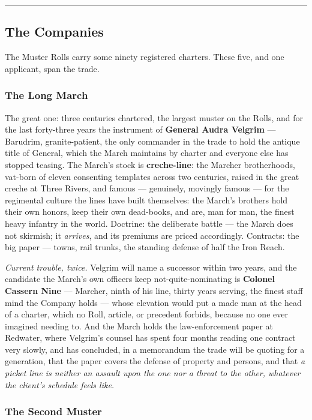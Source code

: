 \medskip\hrule\medskip

\subsection{The Companies}

The Muster Rolls carry some ninety registered charters. These five, and one applicant, span the trade.

\subsubsection{The Long March}

The great one: three centuries chartered, the largest muster on the Rolls, and for the last forty-three years the instrument of \textbf{General Audra Velgrim} --- Barudrim, granite-patient, the only commander in the trade to hold the antique title of General, which the March maintains by charter and everyone else has stopped teasing. The March's stock is \textbf{creche-line}: the Marcher brotherhoods, vat-born of eleven consenting templates across two centuries, raised in the great creche at Three Rivers, and famous --- genuinely, movingly famous --- for the regimental culture the lines have built themselves: the March's brothers hold their own honors, keep their own dead-books, and are, man for man, the finest heavy infantry in the world. Doctrine: the deliberate battle --- the March does not skirmish; it \textit{arrives}, and its premiums are priced accordingly. Contracts: the big paper --- towns, rail trunks, the standing defense of half the Iron Reach.

\textit{Current trouble, twice.} Velgrim will name a successor within two years, and the candidate the March's own officers keep not-quite-nominating is \textbf{Colonel Cassern Nine} --- Marcher, ninth of his line, thirty years serving, the finest staff mind the Company holds --- whose elevation would put a made man at the head of a charter, which no Roll, article, or precedent forbids, because no one ever imagined needing to. And the March holds the law-enforcement paper at Redwater, where Velgrim's counsel has spent four months reading one contract very slowly, and has concluded, in a memorandum the trade will be quoting for a generation, that the paper covers the defense of property and persons, and that \textit{a picket line is neither an assault upon the one nor a threat to the other, whatever the client's schedule feels like.}

\subsubsection{The Second Muster}

